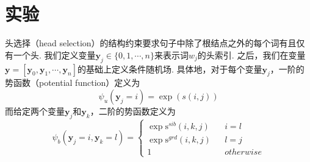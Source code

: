 \section{实验}\label{sec:dep-vi-exp}

头选择（head selection）的结构约束要求句子中除了根结点之外的每个词有且仅有一个头.
我们定义变量$\boldsymbol{y}_j\in \{0,1,\cdots,n\}$来表示词$w_j$的头索引.
之后，我们在变量$\boldsymbol{y}= [\boldsymbol{y}_0,\boldsymbol{y}_1,\cdots,\boldsymbol{y}_n]$的基础上定义条件随机场.
具体地，对于每个变量$\boldsymbol{y}_j$，一阶的势函数（potential function）定义为
\begin{equation}
    \label{eq:1o-potential}
    \psi_u(\boldsymbol{y}_j=i)=\exp(s(i, j))
\end{equation}
而给定两个变量$\boldsymbol{y}_j$和$\boldsymbol{y}_k$，二阶的势函数定义为
\begin{equation}
    \label{eq:2o-potential}
    \psi_b(\boldsymbol{y}_j=i,\boldsymbol{y}_k=l)=\left\{
    \begin{array}{rcl}
        \exp \mathrm{s}^{sib}(i,k,j) &  & {i=l}       \\
        \exp \mathrm{s}^{grd}(i,k,j) &  & {l=j}       \\
        1                            &  & {otherwise}
    \end{array}
    \right.
\end{equation}

